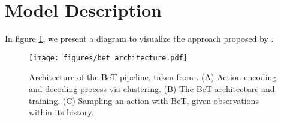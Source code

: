\section{Model Description}\label{app:model_description}

In figure \ref{fig:bet_architecture}, we present a diagram to visualize the approach proposed by \citet{shafiullah2022behavior}.

\begin{figure}[htb]
\texttt{[image: figures/bet\_architecture.pdf]}
\centering
\caption{Architecture of the BeT pipeline, taken from \citet{shafiullah2022behavior}.
(A) Action encoding and decoding process via clustering.
(B) The BeT architecture and training.
(C) Sampling an action with BeT, given observations within its history.}
\label{fig:bet_architecture}
\end{figure}